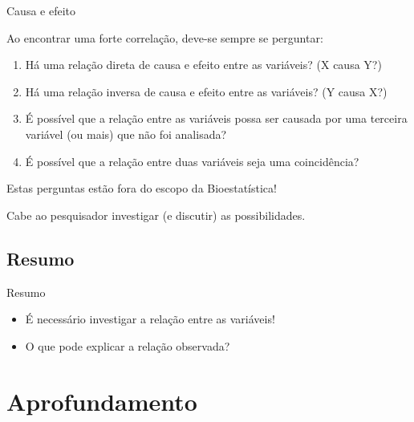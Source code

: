 \documentclass{beamer}
\begin{document}

\begin{frame}{Causa e efeito}
  {\small

    Ao encontrar uma forte correlação, deve-se sempre se perguntar:
  }

  \begin{enumerate}
    \footnotesize
  \item Há uma relação direta de causa e efeito entre as variáveis? (X
    causa Y?)

  \item Há uma relação inversa de causa e efeito entre as variáveis?
    (Y causa X?)

  \item É possível que a relação entre as variáveis possa ser causada
    por uma terceira variável (ou mais) que não foi analisada?

  \item É possível que a relação entre duas variáveis seja uma
    coincidência?
  \end{enumerate}
  \vfill
  \begin{block}{}
    \small
    Estas perguntas estão fora do escopo da Bioestatística!

    \bigskip
    Cabe ao pesquisador investigar (e discutir) as possibilidades.
  \end{block}
\end{frame}

\subsection{Resumo}

\begin{frame}{Resumo}
  \begin{itemize}
  \item É necessário investigar a relação entre as variáveis!
  \item O que pode explicar a relação observada?
  \end{itemize}
\end{frame}

\section{Aprofundamento}
\end{document}
